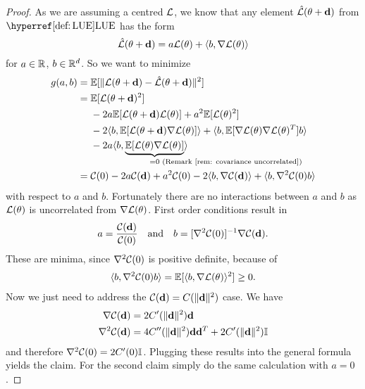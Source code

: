 \begin{proof}
	As we are assuming a centred \(\mathcal{L}\), we know that any  element
	\(\hat{\mathcal{L}}(\theta + \mathbf{d})\) from \(\LUE\) has the form
	\begin{equation*}
		\hat{\mathcal{L}}(\theta + \mathbf{d})
		= a\mathcal{L}(\theta) + \langle b, \nabla\mathcal{L}(\theta)\rangle
	\end{equation*}
	for \(a\in\mathbb{R}\), \(b\in \mathbb{R}^d\). So we want to minimize 
	\begin{align*}
		g(a,b)
		&=\E[\|\Loss(\param +\step) - \hat{\Loss}(\param + \step)\|^2]\\
		&= \begin{aligned}[t]
			&\E[\Loss(\param +\step)^2]\\
			&- 2a\E[\Loss(\param + \step)\Loss(\param)] + a^2 \E[\Loss(\param)^2]\\
			&- 2\langle b, \E[\Loss(\param + \step)\nabla\Loss(\param)]\rangle
			+ \langle b, \E[\nabla\Loss(\param)\nabla\Loss(\param)^T] b\rangle\\
			&- 2a\langle b, \underbrace{\E[\Loss(\param)\nabla\Loss(\param)]}_{
				=0\mathrlap{\text{ (Remark~\ref{rem: covariance uncorrelated})}}
			}\rangle
		\end{aligned}\\
		&=\C(0) - 2a\C(\step) + a^2 \C(0)
		- 2\langle b, \nabla\C(\step)\rangle
		+ \langle b, \nabla^2\C(0) b\rangle
	\end{align*}
	with respect to \(a\) and \(b\). Fortunately there are no interactions
	between \(a\) and \(b\) as \(\mathcal{L}(\theta)\) is uncorrelated from
	\(\nabla\mathcal{L}(\theta)\). First order conditions result in
	\begin{equation*}
		a= \frac{\mathcal{C}(\mathbf{d})}{\mathcal{C}(0)}
		\quad \text{and} \quad
		b = [\nabla^2 \mathcal{C}(0)]^{-1}\nabla \mathcal{C}(\mathbf{d}).
	\end{equation*}
	These are minima, since \(\nabla^2\mathcal{C}(0)\) is positive definite, because of
	\begin{align*}
		\langle b, \nabla^2\mathcal{C}(0) b\rangle = \mathbb{E}[\langle b, \nabla\mathcal{L}(\theta)\rangle^2] \ge 0.
	\end{align*}
	Now we just need to address the \(\mathcal{C}(\mathbf{d}) = C(\|\mathbf{d}\|^2)\) case. We have
	\begin{align*}
		\nabla \mathcal{C}(\mathbf{d}) &= 2C'(\|\mathbf{d}\|^2) \mathbf{d}\\
		\nabla^2 \mathcal{C}(\mathbf{d}) &= 4 C''(\|\mathbf{d}\|^2) \mathbf{d} \mathbf{d}^T + 2C'(\|\mathbf{d}\|^2)\mathbb{I}
	\end{align*}
	and therefore \(\nabla^2\mathcal{C}(0) = 2C'(0)\mathbb{I}\). Plugging these results
	into the general formula yields the claim. For the second claim simply
	do the same calculation with \(a=0\).
\end{proof}

